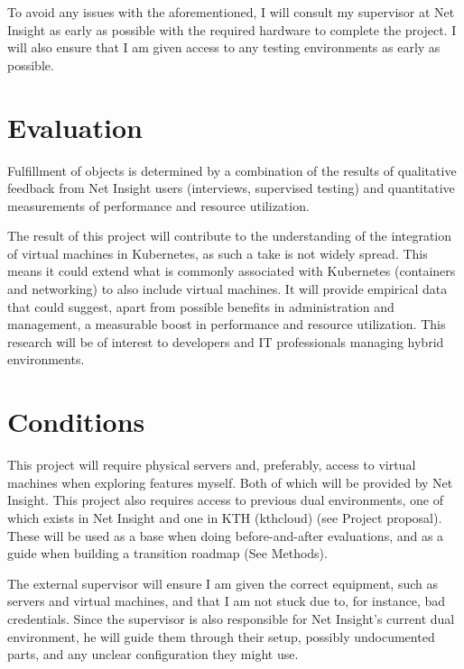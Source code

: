 \documentclass{article}
\begin{document}
To avoid any issues with the aforementioned, I will consult my supervisor at Net Insight as early as possible with the required hardware to complete the project. I will also ensure that I am given access to any testing environments as early as possible.

\section{Evaluation}
Fulfillment of objects is determined by a combination of the results of qualitative feedback from Net Insight users (interviews, supervised testing) and quantitative measurements of performance and resource utilization. 

The result of this project will contribute to the understanding of the integration of virtual machines in Kubernetes, as such a take is not widely spread. This means it could extend what is commonly associated with Kubernetes (containers and networking) to also include virtual machines. It will provide empirical data that could suggest, apart from possible benefits in administration and management, a measurable boost in performance and resource utilization. This research will be of interest to developers and IT professionals managing hybrid environments. 


\section{Conditions}
This project will require physical servers and, preferably, access to virtual machines when exploring features myself. Both of which will be provided by Net Insight.
This project also requires access to previous dual environments, one of which exists in Net Insight and one in KTH (kthcloud) (see Project proposal). These will be used as a base when doing before-and-after evaluations, and as a guide when building a transition roadmap (See Methods).

The external supervisor will ensure I am given the correct equipment, such as servers and virtual machines, and that I am not stuck due to, for instance, bad credentials. Since the supervisor is also responsible for Net Insight’s current dual environment, he will guide them through their setup, possibly undocumented parts, and any unclear configuration they might use. 


\printbibliography[heading=bibintoc]
\end{document}
